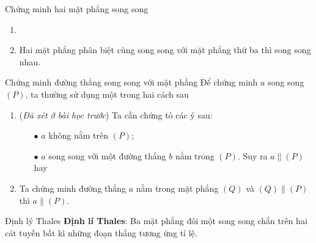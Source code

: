 \begin{dang}{Chứng minh hai mặt phẳng song song}
	\begin{enumerate}[\iconMT]
		\item {} 
		\item {} Hai mặt phẳng phân biệt cùng song song với mặt phẳng thứ ba thì song song nhau.
	\end{enumerate}
\end{dang}

\begin{dang}{Chứng minh đường thẳng song song với mặt phẳng}
	Để chứng minh $a$ song song $(P)$, ta thường sử dụng một trong hai cách sau
	\begin{enumerate}[\iconMT]
		\item {} (\textit{Đã xét ở bài học trước}) Ta cần chứng tỏ các ý sau:
		\begin{itemize}
			\item [$\bullet$] $a$ không nằm trên $(P)$;
			\item [$\bullet$] $a$ song song với một đường thẳng $b$ nằm trong $(P)$. Suy ra $a\parallel (P)$ hay  
		\end{itemize}
		\item {} Ta chứng minh đường thẳng $a$ nằm trong mặt
		phẳng $(Q)$ và $(Q)\parallel (P)$ thì $a \parallel (P)$.
	\end{enumerate}
\end{dang}

\begin{dang}{Định lý Thales}
	\textbf{Định lí Thales}: Ba mặt phẳng đôi một song song chắn trên hai cát tuyến bất kì những đoạn thẳng tương ứng tỉ lệ.
\end{dang}



